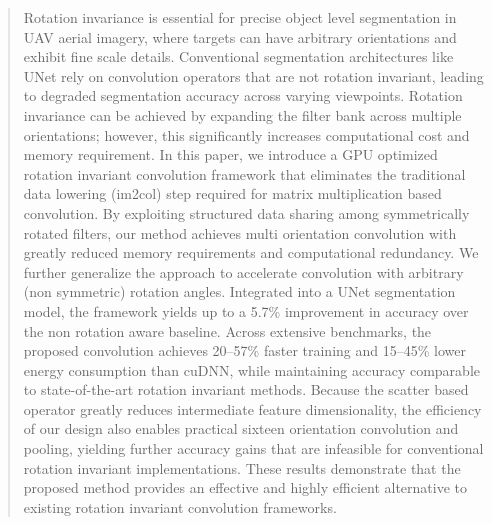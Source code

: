 \begin{abstract}

Rotation invariance is essential for precise object level segmentation in UAV aerial imagery, where targets can have arbitrary orientations and exhibit fine scale details. Conventional segmentation architectures like UNet rely on convolution operators that are not rotation invariant, leading to degraded segmentation accuracy across varying viewpoints. Rotation invariance can be achieved by expanding the filter bank across multiple orientations; however, this significantly increases computational cost and memory requirement.
In this paper, we introduce a GPU optimized rotation invariant convolution framework that eliminates the traditional data lowering (im2col) step required for matrix multiplication based convolution. By exploiting structured data sharing among symmetrically rotated filters, our method achieves multi orientation convolution with greatly reduced memory requirements and computational redundancy. We further generalize the approach to accelerate convolution with arbitrary (non symmetric) rotation angles.
Integrated into a UNet segmentation model, the framework yields up to a 5.7\% improvement in accuracy over the non rotation aware baseline. Across extensive benchmarks, the proposed convolution achieves 20–57\% faster training and 15–45\% lower energy consumption than cuDNN, while maintaining accuracy comparable to state-of-the-art rotation invariant methods. Because the scatter based operator greatly reduces intermediate feature dimensionality, the efficiency of our design also enables practical sixteen orientation convolution and pooling, yielding further accuracy gains that are infeasible for conventional rotation invariant implementations. These results demonstrate that the proposed method provides an effective and highly efficient alternative to existing rotation invariant convolution frameworks.


%


\end{abstract}
